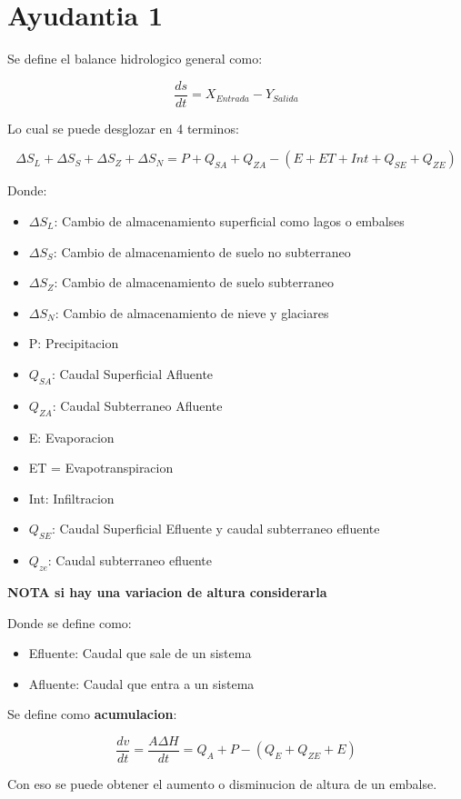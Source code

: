 \part{Ayudantia 1}

Se define el balance hidrologico general como:

\begin{equation}
    \frac{ds}{dt} = X_{Entrada}-Y_{Salida}
\end{equation}

Lo cual se puede desglozar en 4 terminos:

\begin{equation}
    \Delta S_L + \Delta S_S + \Delta S_Z + \Delta S_N = P + Q_{SA} + Q_{ZA} - (E +ET +Int + Q_{SE} + Q_{ZE})
\end{equation}

Donde:

\begin{itemize}
    \item $\Delta S_L$: Cambio de almacenamiento superficial como lagos o embalses
    \item $\Delta S_S$: Cambio de almacenamiento de suelo no subterraneo
    \item $\Delta S_Z$: Cambio de almacenamiento de suelo subterraneo
    \item $\Delta S_N$: Cambio de almacenamiento de nieve y glaciares
    \item P: Precipitacion
    \item $Q_{SA}$: Caudal Superficial Afluente
    \item $Q_{ZA}$: Caudal Subterraneo Afluente
    \item E: Evaporacion
    \item ET = Evapotranspiracion
    \item Int: Infiltracion
    \item $Q_{SE}$: Caudal Superficial Efluente y caudal subterraneo efluente
    \item $Q_{ze}$: Caudal subterraneo efluente
\end{itemize}

\textbf{NOTA si hay una variacion de altura considerarla}

Donde se define como:

\begin{itemize}
    \item Efluente: Caudal que sale de un sistema
    \item Afluente: Caudal que entra a un sistema
\end{itemize}

Se define como \textbf{acumulacion}:

\begin{equation}
    \frac{dv}{dt} = \frac{A\Delta H}{dt}= Q_A + P - (Q_E + Q_{ZE} + E)
\end{equation}

Con eso se puede obtener el aumento o disminucion de altura de un embalse.